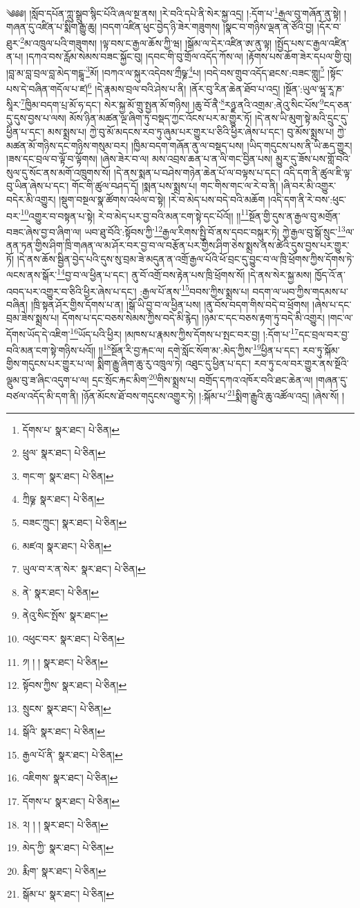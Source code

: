 \setcounter{footnote}{0} 
༄༅༅། །སློབ་དཔོན་ཀླུ་སྒྲུབ་སྙིང་པོའི་ཞལ་སྔ་ནས། །རེ་བའི་དཔེ་ནི་སེར་སྐྱ་འདྲ། །:དོག་པ་\footnote{དོགས་པ་  སྣར་ཐང་།  པེ་ཅིན། }རྒྱལ་བུ་གཞོན་ནུ་སྟེ། །གཞན་དུ་འཛིན་པ་སྨིག་རྒྱུ་ཆུ། །བདག་འཛིན་ཕུང་བྱེད་ཉི་ཟེར་གཟུགས། །སྣང་བ་གཉིས་ལྡན་ནེ་ཙོའི་བྱ། །དོར་བ་ཐུར་\footnote{ཕྲུལ་  སྣར་ཐང་།  པེ་ཅིན། }མ་འཁྲུལ་པའི་གཟུགས། །ལྟ་བས་ང་རྒྱལ་ཆོས་ཀྱི་ཝ། །སྒོམ་ལ་དེར་འཛིན་ཨ་ནུ་ལྟ། །སྤྱོད་པས་ང་རྒྱལ་འཛིན་ན་པ། །དཀའ་བས་རློམ་སེམས་བཟང་སྐྱོང་བུ། །དབང་གི་བུ་གྲོལ་འདོད་ཀོས་ལ། །རྟོགས་པས་ཆོག་ཟེར་དཔལ་གྱི་བུ། །བླ་མ་བླ་བྲལ་བླ་མེད་གངྒཱ་\footnote{གང་ག་  སྣར་ཐང་།  པེ་ཅིན། }མོ། །བཀའ་ལ་སྐུར་འདེབས་ཀྲྀཥྞ་\footnote{ཀྲིཥྞ་  སྣར་ཐང་།  པེ་ཅིན། }པ། །བདེ་བས་གྲུབ་འདོད་ཐངས་:བཟང་གླུ།\footnote{བཟང་ཀྲུང་།  སྣར་ཐང་།  པེ་ཅིན། } །སྟོང་པས་དེ་བཞིན་གདོལ་པ་ཛ།\footnote{མཛའ།  སྣར་ཐང་།  པེ་ཅིན། } །དེ་རྣམས་བྲལ་བའི་ཤེས་པ་ནི། །ནོར་བུ་རིན་ཆེན་ཐོབ་པ་འདྲ། །སྔོན་:ཡུལ་ཝཱ་རཱ་ཎ་སཱིར་\footnote{ཡུལ་བ་ར་ན་སེར་  སྣར་ཐང་།  པེ་ཅིན། }ཁྱིམ་བདག་པྲ་མོ་ཧ་དང་། སེར་སྐྱ་མོ་གྲུ་སྤྱན་མོ་གཉིས། །ཆུ་བོ་ནཻ་\footnote{ནེ་  སྣར་ཐང་།  པེ་ཅིན། }རཉྫ་ནའི་འགྲམ་:ནེའུ་སིང་པོས་\footnote{ནེའུ་སིང་སྤོས་  སྣར་ཐང་། }ངད་ཅན་དུ་དུས་བྱས་པ་ལས། མོས་ཉིན་མཚན་ལྔ་ཞིག་ཏུ་བསྡད་ཀྱང་འོངས་པར་མ་གྱུར་ཏོ། །དེ་ནས་ཡི་མུག་སྟེ་མའི་དྲུང་དུ་ཕྱིན་པ་དང་། མས་སྨྲས་པ། ཀྱེ་བུ་མོ་མདངས་རབ་ཏུ་ཞུམ་པར་གྱུར་པ་ཅིའི་ཕྱིར་ཞེས་པ་དང་། བུ་མོས་སྨྲས་པ། ཀྱེ་མཚན་མོ་གཉིས་དང་གཉིས་གསུམ་བར། །ཁྱིམ་བདག་གཞོན་ནུ་ལ་བསྡད་པས། །ཡིད་གདུངས་པས་ནི་ཡི་ཆད་གྱུར། །ཟས་དང་བྲལ་བ་ལྟོ་བ་ལྟོགས། །ཞེས་ཟེར་བ་ལ། མས་འབྲས་ཆན་པ་ན་ལི་གང་བྱིན་པས། མྱུར་དུ་ཟོས་པས་གློ་བའི་སུལ་དུ་སོང་ནས་མགོ་འཁྲུགས་སོ། །དེ་ནས་སྨན་པ་བཤེས་གཉེན་ཆེན་པོ་ལ་བལྟས་པ་དང་། འདི་དག་ནི་ཚུལ་ཇི་ལྟ་བུ་ཡིན་ཞེས་པ་དང་། གོང་གི་ཚུལ་བཤད་དོ། །སྨན་པས་སྨྲས་པ། གང་གིས་གང་ལ་རེ་བ་ནི། །ཞི་བར་མི་འགྱུར་བདེར་མི་འགྱུར། །སྡུག་བསྔལ་སྣ་ཚོགས་འཕེལ་བ་སྟེ། །རེ་བ་མེད་པས་བདེ་བའི་མཆོག །འདི་དག་ནི་རེ་བས་:ཕུང་བར་\footnote{འཕུང་བར་  སྣར་ཐང་།  པེ་ཅིན། }འགྱུར་བ་བསྟན་པ་སྟེ། རེ་བ་མེད་པར་བྱ་བའི་མན་ངག་སྟེ་དང་པོའོ།། །།\footnote{༡། ། །  སྣར་ཐང་།  པེ་ཅིན། }སྔོན་གྱི་དུས་ན་རྒྱལ་བུ་མགྲོན་བཟང་ཞེས་བྱ་བ་ཞིག་ལ། ཡབ་ཐུ་བོའི་:སྟོབས་ཀྱི་\footnote{སྟོབས་ཀྱིས་  སྣར་ཐང་།  པེ་ཅིན། }རྒྱལ་རིགས་སྤྱི་བོ་ནས་དབང་བསྐུར་ཏེ། ཀྱེ་རྒྱལ་བུ་སྒོ་སྲུང་\footnote{སྲུངས་  སྣར་ཐང་།  པེ་ཅིན། }ལ་ནན་ཏན་གྱིས་ཤིག་ཁྲི་གཞན་ལ་མ་ཤོར་བར་བྱ་བ་ལ་བརྩོན་པར་གྱིས་ཤིག་ཅེས་སྨྲས་ནས་ཚེའི་དུས་བྱས་པར་གྱུར་ཏོ། །དེ་ནས་ཆོས་སྦྱིན་བྱེད་པའི་དུས་སུ་བྲམ་ཟེ་མདུན་ན་འགྲོ་རྒྱལ་པོའི་ཕོ་བྲང་དུ་བྱུང་བ་ལ་ཁྲི་ཕྲོགས་ཀྱིས་དོགས་ཏེ་ལངས་ནས་སྒོར་\footnote{སྒོའི་  སྣར་ཐང་།  པེ་ཅིན། }བྱ་བ་ལ་ཕྱིན་པ་དང་། ནུ་བོ་འགྲོ་བས་རྟེན་པས་ཁྲི་ཕྲོགས་སོ། །དེ་ནས་སེར་སྐྱ་མས། ཁྱོད་འོ་ན་འབད་པར་འགྱུར་བ་ཅིའི་ཕྱིར་ཞེས་པ་དང་། :རྒྱལ་པོ་ནས་\footnote{རྒྱལ་པོ་ནི་  སྣར་ཐང་།  པེ་ཅིན། }བབས་ཀྱིས་སྨྲས་པ། བདག་ལ་ཡབ་ཀྱིས་གདམས་པ་བཞིན། །ཁྲི་སྟན་ཤོར་གྱིས་དོགས་པ་ན། །སྒོ་ཡི་བྱ་བ་ལ་ཕྱིན་པས། །ནུ་བོས་བདག་གིས་བདེ་བ་ཕྲོགས། །ཞེས་པ་དང་བྲམ་ཟེས་སྨྲས་པ། དོགས་པ་དང་བཅས་སེམས་ཀྱིས་བདེ་མི་རྙེད། །ཉམ་ང་དང་བཅས་རྟག་ཏུ་བདེ་མི་འགྱུར། །གང་ལ་དོགས་ཡོད་དེ་འཇིག་\footnote{འཇིགས་  སྣར་ཐང་།  པེ་ཅིན། }ཡོད་པའི་ཕྱིར། །མཁས་པ་རྣམས་ཀྱིས་དོགས་པ་སྤང་བར་བྱ། །:དོག་པ་\footnote{དོགས་པ་  སྣར་ཐང་།  པེ་ཅིན། }དང་བྲལ་བར་བྱ་བའི་མན་ངག་སྟེ་གཉིས་པའོ།། །།\footnote{༢། ། །  སྣར་ཐང་།  པེ་ཅིན། }སྔོན་རི་བྱ་རྐང་ལ། དགེ་སློང་སོག་མ་:མེད་ཀྱིས་\footnote{མེད་ཀྱི་  སྣར་ཐང་།  པེ་ཅིན། }ཕྱིན་པ་དང་། རབ་ཏུ་སྐོམ་གྱིས་གདུངས་པར་གྱུར་པ་ལ། སྨིག་རྒྱུ་ཞིག་ཆུ་རུ་འཁྲུལ་ཏེ། འཐུང་དུ་ཕྱིན་པ་དང་། རབ་ཏུ་ངལ་བར་གྱུར་ནས་སྔོའི་ལྡུམ་བུ་ཟ་ཞིང་འདུག་པ་ལ། དྲང་སྲོང་རྐང་མིག་\footnote{རྨིག་  སྣར་ཐང་།  པེ་ཅིན། }གིས་སྨྲས་པ། བགྲོད་དཀའ་འཁོར་བའི་ཐང་ཆེན་ལ། །གཞན་དུ་བཙལ་འདོད་མི་དག་ནི། །ཉོན་མོངས་ཐོ་བས་གདུངས་འགྱུར་ཏེ། །:སྐོམ་པ་\footnote{སྒོམ་པ་  སྣར་ཐང་།  པེ་ཅིན། }སྨིག་རྒྱུའི་ཆུ་འཚོལ་འདྲ། །ཞེས་སོ། །
